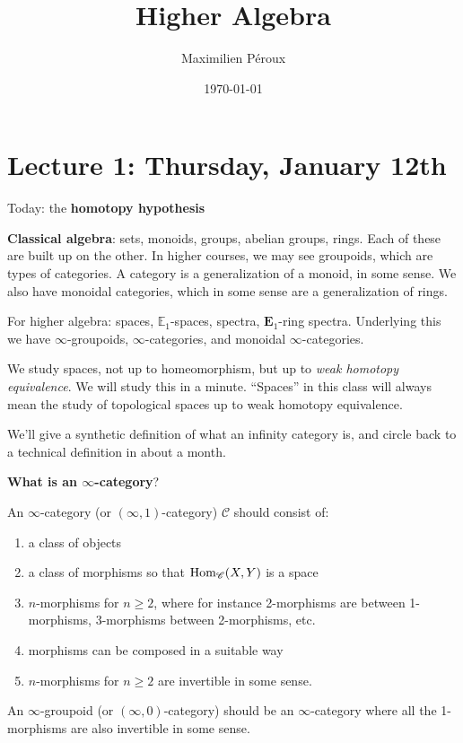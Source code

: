 \documentclass[12pt]{amsart}
\title{Higher Algebra}
\author{Maximilien P\'eroux}
\date{\today}
\theoremstyle{definition}
\begin{document}
\maketitle

\section{Lecture 1: Thursday, January 12th}

Today: the \textbf{homotopy hypothesis}

\textbf{Classical algebra}: sets, monoids, groups, abelian groups, rings. Each of these are built up on the other. In higher courses, we may see groupoids, which are types of categories. A category is a generalization of a monoid, in some sense. We also have monoidal categories, which in some sense are a generalization of rings.

For higher algebra: spaces, $\mathbb{E}_1$-spaces, spectra, $\mathbf{E}_1$-ring spectra. Underlying this we have $\infty$-groupoids, $\infty$-categories, and monoidal $\infty$-categories.

We study spaces, not up to homeomorphism, but up to \textit{weak homotopy equivalence}. We will study this in a minute. ``Spaces'' in this class will always mean the study of topological spaces up to weak homotopy equivalence.

We'll give a synthetic definition of what an infinity category is, and circle back to a technical definition in about a month.

\textbf{What is an $\infty$-category}?

An $\infty$-category (or $(\infty,1)$-category) $\mathscr{C}$ should consist of:
\begin{enumerate}
    \item a class of objects
    \item a class of morphisms so that $\text{Hom}_\mathscr{C}(X,Y)$ is a space
    \item $n$-morphisms for $n \ge 2$, where for instance 2-morphisms are between 1-morphisms, 3-morphisms between 2-morphisms, etc.
    \item morphisms can be composed in a suitable way
    \item $n$-morphisms for $n\ge 2$ are invertible in some sense.
\end{enumerate}

An $\infty$-groupoid (or $(\infty,0)$-category) should be an $\infty$-category where all the 1-morphisms are also invertible in some sense.
\end{document}
